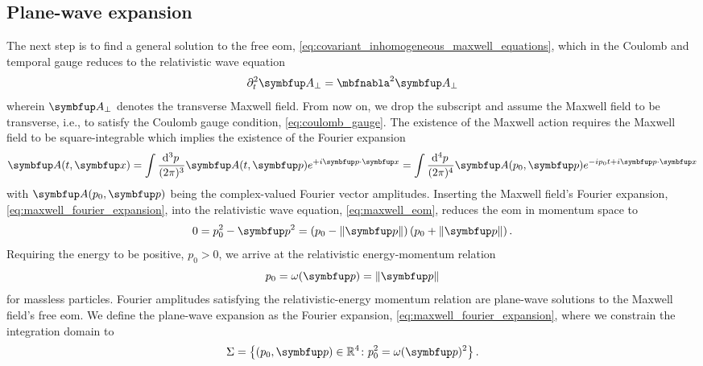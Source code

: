 \subsection{Plane-wave expansion}

The next step is to find a general solution to the free \gls{eom}, \cref{eq:covariant_inhomogeneous_maxwell_equations},
which in the Coulomb and temporal gauge reduces to the relativistic wave equation
\begin{equation}
	\partial_t^2
	\vb{A}_\perp
	=
	\laplace
	\vb{A}_\perp
	\label{eq:maxwell_eom}
\end{equation}
wherein $\vb{A}_\perp$ denotes the transverse Maxwell field.
From now on, we drop the subscript and assume the Maxwell field to be transverse, i.e., to satisfy the Coulomb gauge condition, \cref{eq:coulomb_gauge}.
The existence of the Maxwell action requires the Maxwell field to be square-integrable which implies the existence of the Fourier expansion
\begin{equation}
	\vb{A}(t,\vb{x})
	=
	\int\frac{\dd[3]{p}}{(2\pi)^3}
	\vb{A}(t,\vb{p})
	e^{+i\vb{p}\vdot\vb{x}}
	=
	\int\frac{\dd[4]{p}}{(2\pi)^4}
	\vb{A}(p_0,\vb{p})
	e^{-ip_0t+i\vb{p}\vdot\vb{x}}
	\label{eq:maxwell_fourier_expansion}
\end{equation}
with $\vb{A}(p_0,\vb{p})$ being the complex-valued Fourier vector amplitudes.
Inserting the Maxwell field's Fourier expansion, \cref{eq:maxwell_fourier_expansion}, into the relativistic wave equation, \cref{eq:maxwell_eom}, reduces the \gls{eom} in momentum space to
\begin{equation}
	0
	=
	p_0^2
	-
	\vb{p}^2
	=
	\left(
		p_0
		-
		\norm{\vb{p}}
	\right)
	\left(
		p_0
		+
		\norm{\vb{p}}
	\right)
	\label{eq:maxwell_eom_momentum}
	.
\end{equation}
Requiring the energy to be positive, $p_0>0$, we arrive at the relativistic energy-momentum relation
\begin{equation}
	p_0
	=
	\omega(\vb{p})
	=
	\norm{\vb{p}}
	\label{eq:energy_momentum_relation}
\end{equation}
for massless particles.
Fourier amplitudes satisfying the relativistic-energy momentum relation are plane-wave solutions to the Maxwell field's free \gls{eom}.
We define the plane-wave expansion as the Fourier expansion, \cref{eq:maxwell_fourier_expansion}, where we constrain the integration domain to
\begin{equation*}
	\Sigma
	=
	\left\{
		\left(p_0,\vb{p}\right)
		\in
		\mathbb{R}^4
		\colon
		p_0^2
		=
		\omega(\vb{p})^2
	\right\}
	.
\end{equation*}
